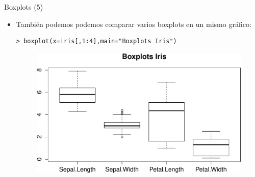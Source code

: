 \documentclass[handout]{beamer}
\begin{document}
\begin{frame}[fragile]{Boxplots (5)}
\scriptsize{
\begin{itemize}

\item También podemos podemos comparar varios boxplots en un mismo gráfico:
\begin{verbatim}
> boxplot(x=iris[,1:4],main="Boxplots Iris")
\end{verbatim}

 \begin{figure}[h!]
	\centering
	\includegraphics[scale=0.5]{imagenes/boxplotiris.pdf}		
\end{figure} 
 
\end{itemize}

}
\end{frame}
\end{document}
